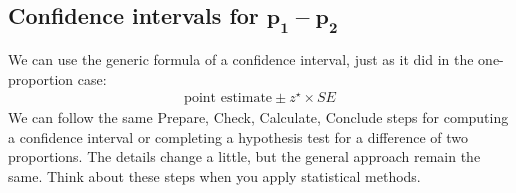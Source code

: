 

\subsection[Confidence intervals for $p_1 - p_2$]
    {Confidence intervals for $\mathbf{p_1 - p_2}$}


\noindent%
We can use
the generic formula of a confidence interval, just as it did in the one-proportion case:
\begin{align*}
\text{point estimate} \pm z^{\star} \times SE
\end{align*}
We can follow the same Prepare, Check, Calculate, Conclude
steps for
computing a confidence interval
or
completing a hypothesis test
for a difference of two proportions.
The details change a little,
but the general approach remain the same.
Think about these steps when you apply statistical methods.

